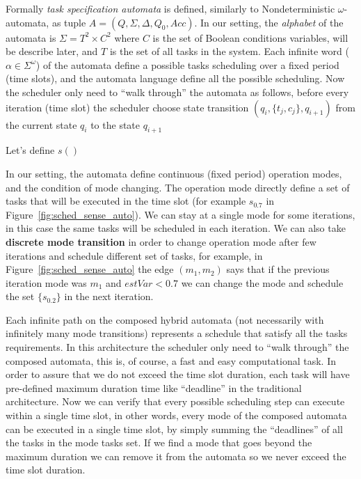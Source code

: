 \documentclass[ twoside, 12pt ]{article}
\begin{document}
{%
Formally \textit{task specification automata} is defined, similarly to Nondeterministic $\omega$-automata, as tuple $A=(Q,\Sigma,\Delta,Q_0,Acc)$.
In our setting, the \textit{alphabet} of the automata is $\Sigma = T^2 \times C^2$ where 
$C$ is the set of Boolean conditions variables, will be describe later, and $T$ is the set of all tasks in the system.
Each infinite word ($\alpha \in \Sigma^\omega$) of the automata define a possible tasks scheduling over a fixed period (time slots), and the automata language define all the possible scheduling.
Now the scheduler only need to ``walk through'' the automata as follows, before every iteration (time slot) the scheduler choose state transition $(q_i , \{t_j , c_j\}, q_{i+1})$ from the current state $q_i$ to the state $q_{i+1}$


Let's define $s()$









In our setting, the automata define continuous (fixed period) operation modes, and the condition of mode changing.
The operation mode directly define a set of tasks that will be executed in the time slot (for example $s_{0.7}$ in Figure~\ref{fig:sched_sense_auto}).
We can stay at a single mode for some iterations, in this case the same tasks will be scheduled in each iteration. 
We can also take \textbf{discrete mode transition} in order to change operation mode after few iterations and schedule different set of tasks, for example, in Figure~\ref{fig:sched_sense_auto} the edge $(m_1,m_2)$ says that if the previous iteration mode was $m_1$ and $estVar < 0.7$ we can change the mode and schedule the set $\{s_{0.2}\}$ in the next iteration.

Each infinite path on the composed hybrid automata (not necessarily with infinitely many mode transitions) represents a schedule that satisfy all the tasks requirements. 
In this architecture the scheduler only need to ``walk through'' the composed automata, this is, of course, a fast and easy computational task. 
In order to assure that we do not exceed the time slot duration, each task will have pre-defined maximum duration time like ``deadline'' in the traditional architecture. Now we can verify that every possible scheduling step can execute within a single time slot, in other words, every mode of the composed automata can be executed in a single time slot, by simply summing the ``deadlines'' of all the tasks in the mode tasks set.
If we find a mode that goes beyond the maximum duration we can remove it from the automata so we never exceed the time slot duration.


}
\end{document}
